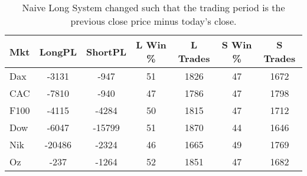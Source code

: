 \begin{table}[ht]
\centering
\caption[Naive Long System - Close to Close]{Naive Long System changed such that the trading period is the previous close price minus today's close.} 
\label{tab:ntfresults}
\begin{tabular}{lcccccc}
  \toprule Mkt & LongPL & ShortPL & L Win \% & L Trades & S Win \% & S Trades \\ 
  \midrule Dax & -3131 & -947 & 51 & 1826 & 47 & 1672 \\ 
  CAC & -7810 & -940 & 47 & 1786 & 47 & 1798 \\ 
  F100 & -4115 & -4284 & 50 & 1815 & 47 & 1712 \\ 
  Dow & -6047 & -15799 & 51 & 1870 & 44 & 1646 \\ 
  Nik & -20486 & -2324 & 46 & 1665 & 49 & 1769 \\ 
  Oz & -237 & -1264 & 52 & 1851 & 47 & 1682 \\ 
   \bottomrule \end{tabular}
\end{table}
